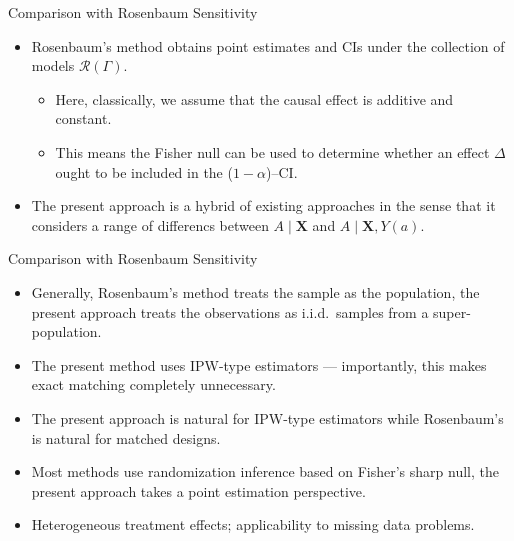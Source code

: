 \documentclass{beamer}
\begin{document}
\begin{frame}{Comparison with Rosenbaum Sensitivity}

\begin{itemize}
  \itemsep12pt
  \item Rosenbaum's method obtains point estimates and CIs under the collection
    of models $\mathcal{R}(\Gamma)$.
    \begin{itemize}
      \itemsep8pt
      \item Here, classically, we assume that the causal effect is additive and
        constant.
      \item This means the Fisher null can be used to determine whether an
        effect $\Delta$ ought to be included in the ($1-\alpha$)--CI.
    \end{itemize}
  \item The present approach is a hybrid of existing approaches in the sense
    that it considers a range of differencs between $A\mid\bm{X}$ and
    $A\mid\bm{X}, Y(a)$.
\end{itemize}

\end{frame}


\begin{frame}{Comparison with Rosenbaum Sensitivity}

\begin{itemize}
  \itemsep8pt
  \item Generally, Rosenbaum's method treats the sample as the population, the
    present approach treats the observations as i.i.d.~samples from a
    super-population.
  \item The present method uses IPW-type estimators --- importantly, this makes
    exact matching completely unnecessary.
  \item The present approach is natural for IPW-type estimators while
    Rosenbaum's is natural for matched designs.
  \item Most methods use randomization inference based on Fisher's sharp null,
    the present approach takes a point estimation perspective.
  \item Heterogeneous treatment effects; applicability to missing data problems.
\end{itemize}

\end{frame}

\end{document}
